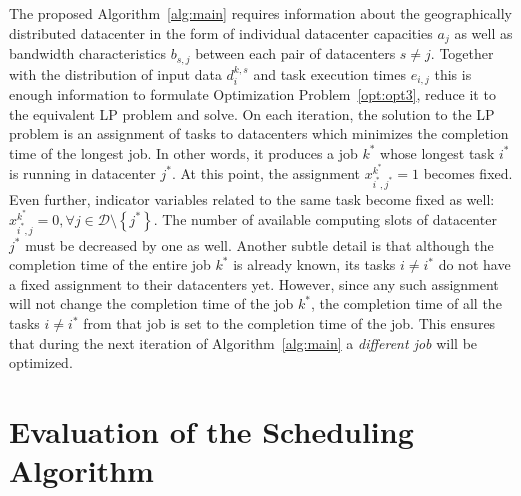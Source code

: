 The proposed Algorithm~\ref{alg:main} requires information about the geographically distributed datacenter in the form of individual datacenter capacities \(a_j\) as well as bandwidth characteristics \(b_{s, j}\) between each pair of datacenters \(s\neq j\). Together with the distribution of input data \(d^{k, s}_i\) and task execution times \(e_{i, j}\) this is enough information to formulate Optimization Problem~\ref{opt:opt3}, reduce it to the equivalent LP problem and solve. On each iteration, the solution to the LP problem is an assignment of tasks to datacenters which minimizes the completion time of the longest job. In other words, it produces a job \(k^*\) whose longest task \(i^*\) is running in datacenter \(j^*\). At this point, the assignment \(x^{k^*}_{i^*, j^*} = 1\) becomes fixed. Even further, indicator variables related to the same task become fixed as well: \(x^{k^*}_{i^*, j}=0, \forall j\in\mathcal{D}\setminus \left\{j^*\right\}\). The number of available computing slots of datacenter \(j^*\) must be decreased by one as well. Another subtle detail is that although the completion time of the entire job \(k^*\) is already known, its tasks \(i\neq i^*\) do not have a fixed assignment to their datacenters yet. However, since any such assignment will not change the completion time of the job \(k^*\), the completion time of all the tasks \(i\neq i^*\) from that job is set to the completion time of the job. This ensures that during the next iteration of Algorithm~\ref{alg:main} a \emph{different job} will be optimized.



\section{Evaluation of the Scheduling Algorithm}


